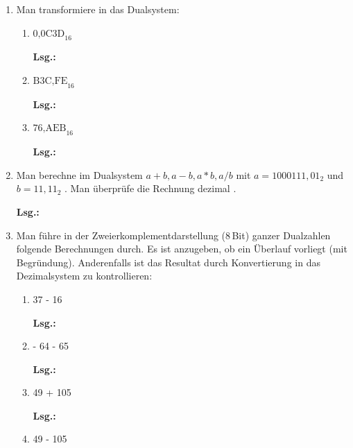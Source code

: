 \documentclass[12pt,a4paper]{scrreprt}
\newcommand{\Lsg}{\par \textbf{Lsg.: }}
\newcommand{\Bit}{\,Bit}
\begin{document}
\begin{enumerate}
\begin{enumerate}
\item $\text{AB,CDE}_{16}$

\Lsg%

\end{enumerate}

\item Man transformiere in das Dualsystem:

\begin{enumerate}
\item $\text{0,0C3D}_{16}$

\Lsg%

\item $\text{B3C,FE}_{16}$

\Lsg%

\item $\text{76,AEB}_{16}$

\Lsg%

\end{enumerate}

\item Man berechne im Dualsystem $a+ b, a- b , a*b, a/b$ mit $a= 1000111,01_2$
und $b = 11,11_2$ . Man überprüfe die Rechnung dezimal .

\Lsg%

\item Man führe in der Zweierkomplementdarstellung (\si{8}{\Bit}) ganzer Dualzahlen folgende Berechnungen durch. Es ist anzugeben, ob ein Überlauf
vorliegt (mit Begründung). Anderenfalls ist das Resultat durch Konvertierung in das Dezimalsystem zu kontrollieren:

\begin{enumerate}
\item 37 - 16

\Lsg%

\item - 64 - 65

\Lsg%

\item 49 + 105

\Lsg%

\item 49 - 105


\end{enumerate}
\end{enumerate}
\end{document}
